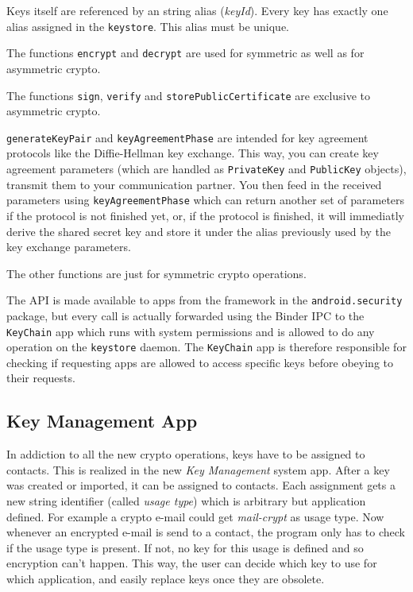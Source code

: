 \documentclass[a4paper,draft]{scrartcl}
\begin{document}
		Keys itself are referenced by an string alias (\emph{keyId}). Every key has exactly one alias assigned in the \texttt{keystore}. This alias must be unique.
	
		The functions \texttt{encrypt} and \texttt{decrypt} are used for symmetric as well as for asymmetric crypto.

		The functions \texttt{sign}, \texttt{verify} and \texttt{storePublicCertificate} are exclusive to asymmetric crypto.

		\texttt{generateKeyPair} and \texttt{keyAgreementPhase} are intended for key agreement protocols like the Diffie-Hellman key exchange. This way, you can create key agreement parameters (which are handled as \texttt{PrivateKey} and \texttt{PublicKey} objects), transmit them to your communication partner. You then feed in the received parameters using \texttt{keyAgreementPhase} which can return another set of parameters if the protocol is not finished yet, or, if the protocol is finished, it will immediatly derive the shared secret key and store it under the alias previously used by the key exchange parameters.

		The other functions are just for symmetric crypto operations.

		The API is made available to apps from the framework in the \texttt{android.security} package, but every call
		is actually forwarded using the Binder IPC to the \texttt{KeyChain} app which runs with system permissions and
		is allowed to do any operation on the \texttt{keystore} daemon. The \texttt{KeyChain} app is therefore responsible
		for checking if requesting apps are allowed to access specific keys before obeying to their requests.
	
	\subsection{Key Management App}
		In addiction to all the new crypto operations, keys have to be assigned to contacts. This is realized in the new {\em Key Management} system app. After a key was created or imported, it can be assigned to contacts. Each assignment gets a new string identifier (called {\em usage type}) which is arbitrary but application defined. For example a crypto e-mail could get \textit{mail-crypt} as usage type. Now whenever an encrypted e-mail is send to a contact, the program only has to check if the usage type is present. If not, no key for this usage is defined and so encryption can't happen. This way, the user can decide which key to use for which application, and easily replace keys once they are obsolete.
		
\end{document}
